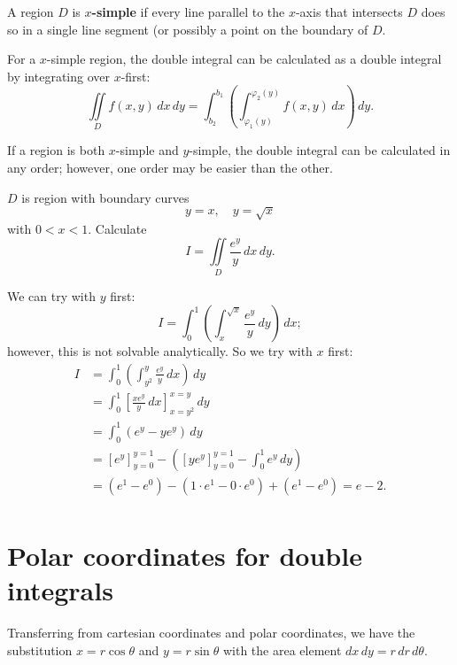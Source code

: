 \begin{definition}
    A region $D$ is \textbf{$x$-simple} if every line parallel to the $x$-axis that intersects $D$ does so in a single line segment (or possibly a point on the boundary of $D$.
\end{definition}

For a $x$-simple region, the double integral can be calculated as a double integral by integrating over $x$-first: \[ \iint\limits_{D} f(x, y) \, dx \, dy = \int_{b_2}^{b_1} \left( \int_{\varphi_1(y)}^{\varphi_2(y)} f(x, y) \, dx \right) \, dy. \]

\begin{remark}
    If a region is both $x$-simple and $y$-simple, the double integral can be calculated in any order; however, one order may be easier than the other.
\end{remark}

\begin{example}
    $D$ is region with boundary curves \[ y = x, \quad y = \sqrt{x} \] with $0 < x < 1$. Calculate \[ I = \iint\limits_{D} \frac{e^y}{y} \, dx \, dy. \]
    
    We can try with $y$ first: \[ I = \int_{0}^{1} \left( \int_{x}^{\sqrt{x}} \frac{e^y}{y} \, dy \right) \, dx; \] however, this is not solvable analytically. So we try with $x$ first: 
    \begin{align*}
        I &= \int_{0}^{1} \left( \int_{y^2}^{y} \frac{e^y}{y} \, dx \right) \, dy \\
        &= \int_{0}^{1} \left[ \frac{x e^y}{y} \, dx \right]_{x = y^2}^{x = y} \, dy \\
        &= \int_{0}^{1} \left( e^y - y e^y \right) \, dy \\
        &= \left[ e^y \right]^{y = 1}_{y = 0} - \left( \left[ y e^y \right]^{y = 1}_{y = 0} - \int_{0}^{1}e^y\, dy \right) \\
        &= (e^1 - e^0) - (1 \cdot e^1 - 0 \cdot e^0) + (e^1 - e^0) = e - 2. \\
    \end{align*}
\end{example}

\section{Polar coordinates for double integrals}

Transferring from cartesian coordinates and polar coordinates, we have the substitution $x = r \cos{\theta}$ and $y = r \sin{\theta}$ with the area element $dx \, dy = r\,dr\,d\theta$.

